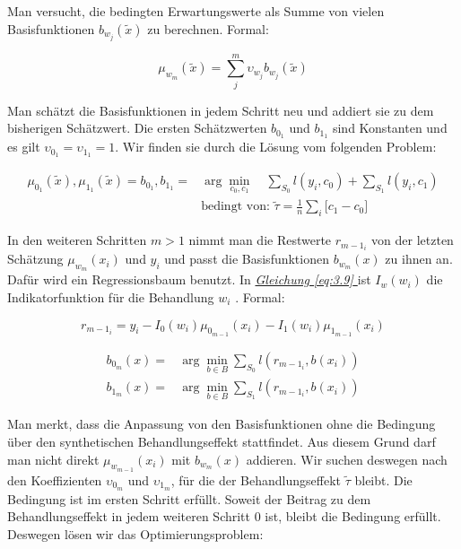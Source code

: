 \documentclass[12pt,a4paper,twoside]{scrartcl}
\numberwithin{equation}{section}
\renewcommand*{\refeq}[1]{\emph{\hyperref[#1]{Gleichung \ref*{#1} }}}
\begin{document}
\noindent
Man versucht, die bedingten Erwartungswerte als Summe von vielen Basisfunktionen $b_{w_j}(\tilde{x})$ zu berechnen. Formal:\par

\begin{equation}\label{eq:3.7}
 \mu_{w_m}(\tilde{x}) = \sum_j^m \upsilon_{w_j}b_{w_j}(\tilde{x})
\end{equation}

\noindent
Man schätzt die Basisfunktionen in jedem Schritt neu und addiert sie zu dem bisherigen Schätzwert. Die ersten Schätzwerten $b_{0_1}$ und $b_{1_1}$ sind Konstanten und es gilt $\upsilon_{0_1} = \upsilon_{1_1} = 1$. Wir finden sie durch die Lösung vom folgenden Problem\cite{schuler2017synth}: \par 

\begin{equation}\label{eq:3.8}
\begin{split}
	\mu_{0_1}(\tilde{x}),\mu_{1_1}(\tilde{x}) = b_{0_1},b_{1_1} = &\arg\min_{c_0,c_1} \quad \sum_{S_0} l(y_i,c_0) + \sum_{S_1} l(y_i,c_1)\\
 &\text{bedingt von: } \tilde{\tau} = \frac{1}{n} \sum_i \big [c_1 - c_0 \big ]
\end{split}
\end{equation}

\noindent
In den weiteren Schritten $m>1$ nimmt man die Restwerte $r_{{m-1}_i}$ von der letzten Schätzung $\mu_{w_m}(x_i)$ und $y_i$ und passt die Basisfunktionen $b_{w_m}(x)$ zu ihnen an. Dafür wird ein Regressionsbaum benutzt. In \refeq{eq:3.9} ist $I_w(w_i)$ die Indikatorfunktion für die Behandlung $w_i$ \cite{schuler2017synth}. Formal:\par

\begin{equation}\label{eq:3.9}
r_{{m-1}_i} = y_i - I_0(w_i)\mu_{0_{m-1}}(x_i)-I_1(w_i)\mu_{1_{m-1}}(x_i)
\end{equation}

\begin{equation}\label{eq:3.10}
\begin{split}
	 b_{0_m}(x) = &\arg\min_{b \in B} \sum_{S_0} l(r_{{m-1}_i},b(x_i))\\
	 b_{1_m}(x) = &\arg\min_{b \in B} \sum_{S_1} l(r_{{m-1}_i},b(x_i))
\end{split}
\end{equation}

\noindent
Man merkt, dass die Anpassung von den Basisfunktionen ohne die Bedingung über den synthetischen Behandlungseffekt stattfindet. Aus diesem Grund darf man nicht direkt $\mu_{w_{m-1}}(x_i)$ mit $b_{w_m}(x)$ addieren. Wir suchen deswegen nach den Koeffizienten $\upsilon_{0_m}$ und $\upsilon_{1_m}$, für die der Behandlungseffekt $\tilde{\tau}$ bleibt. Die Bedingung ist im ersten Schritt erfüllt. Soweit der Beitrag zu dem Behandlungseffekt in jedem weiteren Schritt $0$ ist, bleibt die Bedingung erfüllt\cite{schuler2017synth}. Deswegen lösen wir das Optimierungsproblem:\par 
\end{document}
